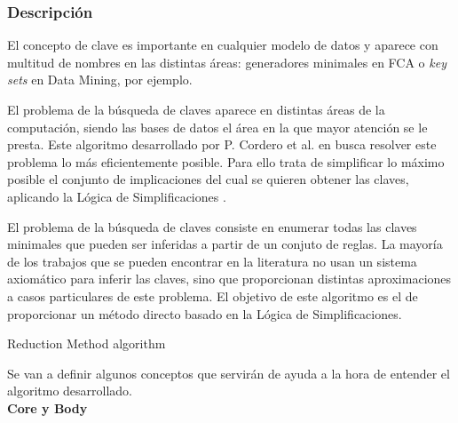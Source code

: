 \subsubsection{Descripci\'on} 

El concepto de clave es importante en cualquier modelo de datos y aparece con multitud de nombres en las distintas \'areas: generadores minimales en FCA o \textit{key sets} en Data Mining, por ejemplo.

El problema de la b\'usqueda de claves aparece en distintas \'areas de la computaci\'on, siendo las bases de datos el \'area en la que mayor atenci\'on se le presta. Este algoritmo desarrollado por P. Cordero et al. en  \cite{Reduction} busca resolver este problema lo m\'as eficientemente posible. Para ello trata de simplificar lo m\'aximo posible el conjunto de implicaciones del cual se quieren obtener las claves, aplicando la L\'ogica de Simplificaciones \cite{Cordero2002}.

El problema de la b\'usqueda de claves consiste en enumerar todas las claves minimales que pueden ser inferidas a partir de un conjuto de reglas. La mayor\'ia de los trabajos que se pueden encontrar en la literatura no usan un sistema axiom\'atico para inferir las claves, sino que proporcionan distintas aproximaciones a casos particulares de este problema. El objetivo de este algoritmo es el de proporcionar un m\'etodo directo basado en la L\'ogica de Simplificaciones.

\IncMargin{1em}
\begin{algorithm}[H]
    \SetAlgoLined
    \DontPrintSemicolon
    \caption{Reduction Method algorithm}\label{alg:3}
\end{algorithm}\DecMargin{1em}
\newpage
Se van a definir algunos conceptos que servir\'an de ayuda a la hora de entender el algoritmo desarrollado.\\

\textbf{Core y Body}

